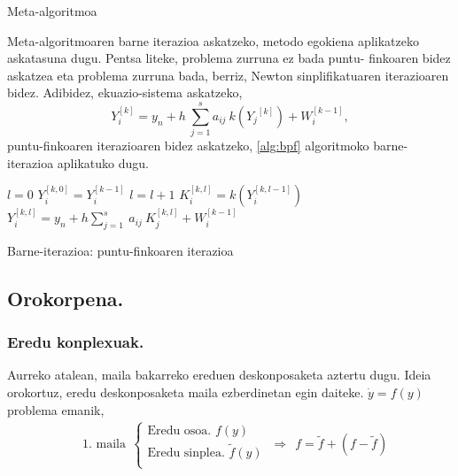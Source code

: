 \begin{algorithm}[H]
 \caption{Meta-algoritmoa}
\end{algorithm}

Meta-algoritmoaren barne iterazioa askatzeko, metodo egokiena aplikatzeko askatasuna dugu. Pentsa liteke,  problema zurruna ez bada puntu- finkoaren bidez askatzea eta problema zurruna bada, berriz,  Newton sinplifikatuaren iterazioaren bidez. Adibidez, ekuazio-sistema askatzeko,
\begin{equation*}
 Y_i^{[k]}=y_n+h\  \sum^s_{j=1}{a_{ij}\ k({Y_j}^{[k]})+W^{[k-1]}_i},
\end{equation*}
puntu-finkoaren iterazioaren bidez askatzeko, \ref{alg:bpf} algoritmoko barne-iterazioa aplikatuko dugu. 

\begin{algorithm}[H]
 \BlankLine
  $l=0$\;
  $Y_{i}^{[k,0]}=Y_{i}^{[k-1]}$\;
  {
   \BlankLine
   $l=l+1$\;  
   \BlankLine
   $K_{i}^{[k,l]}=k(Y_{i}^{[k,l-1]})$\;
   $Y_{i}^{[k,l]}=y_{n} + h \sum\limits_{j=1}^{s} \ a_{ij} \ K_{j}^{[k,l]}  +  W_{i}^{[k-1]} $\;
  }
 \caption{Barne-iterazioa: puntu-finkoaren iterazioa}
 \label{alg:bpf}
\end{algorithm}

\subsection*{Orokorpena.}

\subsubsection*{Eredu konplexuak.}
Aurreko atalean, maila bakarreko ereduen deskonposaketa aztertu dugu. Ideia orokortuz, eredu deskonposaketa maila ezberdinetan egin daiteke.  $\dot{y} =f(y)$ problema emanik, 
\begin{align*}
&\mbox{1. maila} \ \
\left \{ \begin{array}{c}
  \mbox{Eredu osoa.   } f(y) \\[.25cm]
  \mbox{Eredu sinplea.    } \tilde{f}(y)  \\
\end{array} \right.
\ \Rightarrow \ \
f =\tilde{f}+(f-\tilde{f})  
\end{align*}

